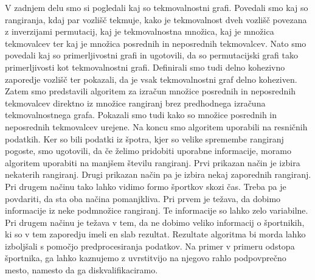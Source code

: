 \documentclass[a4paper, 12pt]{book}
\begin{document}
V zadnjem delu smo si pogledali kaj so tekmovalnostni grafi. Povedali smo kaj so rangiranja, kdaj par vozlišč tekmuje, kako je tekmovalnost dveh vozlišč povezana z inverzijami permutacij, kaj je tekmovalnostna množica, kaj je množica tekmovalcev ter kaj je množica posrednih in neposrednih tekmovalcev. Nato smo povedali kaj so primerljivostni grafi in ugotovili, da so permutacijski grafi tako primerljivosti kot tekmovalnostni grafi. Definirali smo tudi delno kohezivno zaporedje vozlišč ter pokazali, da je vsak tekmovalnostni graf delno koheziven. Zatem smo predstavili algoritem za izračun množice posrednih in neposrednih tekmovalcev direktno iz množice rangiranj brez predhodnega izračuna tekmovalnostnega grafa. Pokazali smo tudi kako so množice posrednih in neposrednih tekmovalcev urejene. Na koncu smo algoritem uporabili na resničnih podatkih. Ker so bili podatki iz špotra, kjer so velike spremembe rangiranj pogoste, smo ugotovili, da če želimo pridobiti uporabne informacije, moramo algoritem uporabiti na manjšem številu rangiranj. Prvi prikazan način je izbira nekaterih rangiranj. Drugi prikazan način pa je izbira nekaj zaporednih rangiranj. Pri drugem načinu tako lahko vidimo formo športkov skozi čas. Treba pa je povdariti, da sta oba načina pomanjkliva. Pri prvem je težava, da dobimo informacije iz neke podmnožice rangiranj. Te informacije so lahko zelo variabilne. Pri drugem načinu je težava v tem, da ne dobimo veliko informacij o športnikih, ki so v tem zaporedju imeli en slab rezultat. Rezultate algoritma bi morda lahko izboljšali s pomočjo predprocesiranja podatkov. Na primer v primeru odstopa športnika, ga lahko kaznujemo z uvrstitvijo na njegovo rahlo podpovprečno mesto, namesto da ga diskvalifikaciramo.

\cleardoublepage
{}


\end{document}

